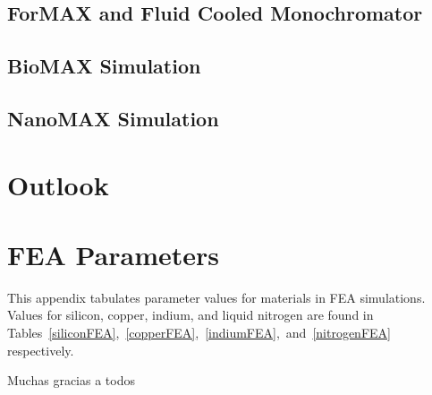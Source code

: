 \documentclass[preprint]{iucr}              %
\begin{document}
\subsection{ForMAX and Fluid Cooled Monochromator}\label{formax}
\subsection{BioMAX Simulation}\label{biomax}
\subsection{NanoMAX Simulation}\label{nanomax}

\section{Outlook}


\appendix

\section{FEA Parameters}\label{feaparameters}

This appendix tabulates parameter values for materials in FEA simulations. Values for silicon, copper, indium, and liquid nitrogen are found in Tables~\ref{siliconFEA},~\ref{copperFEA},~\ref{indiumFEA},~and~\ref{nitrogenFEA} respectively.
\vspace{1.5cm}







Muchas gracias a todos


\end{document}
